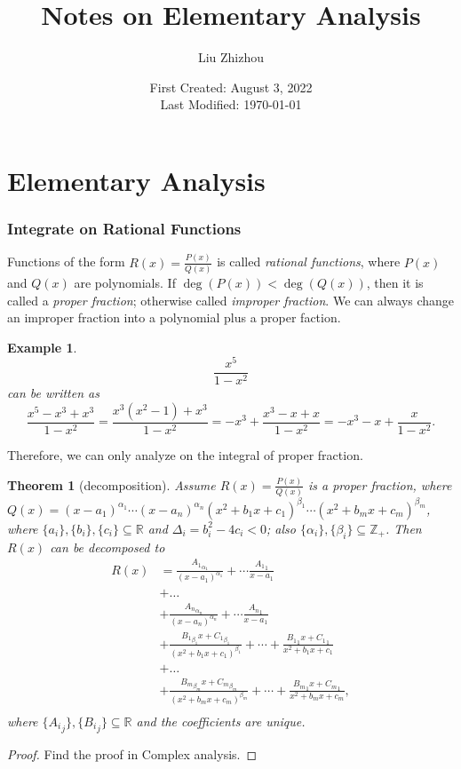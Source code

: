 \documentclass[12pt,a4paper]{article}
\title{Notes on Elementary Analysis}
\author{Liu Zhizhou}
\date{First Created: August 3, 2022\\
	Last Modified: \today}
\numberwithin{equation}{section}
\theoremstyle{mystyle}
\newtheorem{theorem}[definition]{Theorem}
\newtheorem{example}[definition]{Example}
\newcommand{\R}{\mathbb{R}}
\newcommand{\Z}{\mathbb{Z}}
\begin{document}
	{\sffamily\bfseries \maketitle}
	
	
	\tableofcontents
	\part{Elementary Analysis}
	\section{Integrate on Rational Functions}
	Functions of the form $R(x)=\frac{P(x)}{Q(x)}$ is called \emph{rational functions}, where $P(x)$ and $Q(x)$ are polynomials. If $\deg(P(x))<\deg(Q(x))$, then it is called a \emph{proper fraction}; otherwise called \emph{improper fraction}. We can always change an improper fraction into a polynomial plus a proper faction.
	\begin{example}
		$$\frac{x^5}{1-x^2}$$ can be written as $$\frac{x^5-x^3+x^3}{1-x^2}=\frac{x^3(x^2-1)+x^3}{1-x^2}=-x^3+\frac{x^3-x+x}{1-x^2}=-x^3-x+\frac{x}{1-x^2}.$$
	\end{example}
	Therefore, we can only analyze on the integral of proper fraction.
	\begin{theorem}[decomposition]
		Assume $R(x)=\frac{P(x)}{Q(x)}$ is a proper fraction, where $Q(x)=(x-a_1)^{\alpha_1}\cdots (x-a_n)^{\alpha_n}(x^2+b_1 x+c_1)^{\beta_1}\cdots (x^2+b_m x+c_m)^{\beta_m}$, where $\{a_i\},\{b_i\},\{c_i\}\subseteq \R$ and $\Delta_i = b_i^2-4c_i<0$; also $\{\alpha_i\},\{\beta_i\}\subseteq \Z_+$. Then $R(x)$ can be decomposed to
		\begin{align*}
			R(x)  &=\frac{{A_1}_{\alpha_1}}{(x-a_1)^{\alpha_1}}+\cdots \frac{{A_1}_{1}}{x-a_1}\\
			&+\dots\\
			&+\frac{{A_n}_{\alpha_n}}{(x-a_n)^{\alpha_n}}+\cdots \frac{{A_n}_{1}}{x-a_1}\\
			&+\frac{{B_1}_{\beta_1}x+{C_1}_{\beta_1}}{(x^2+b_1 x+c_1)^{\beta_1}} + \cdots + \frac{{B_1}_{1}x+{C_1}_{1}}{x^2+b_1 x+c_1}\\
			&+\dots\\
			&+\frac{{B_m}_{\beta_m}x+{C_m}_{\beta_m}}{(x^2+b_m x+c_m)^{\beta_m}}+ \cdots + \frac{{B_m}_{1}x+{C_m}_{1}}{x^2+b_m x+c_m},\\
		\end{align*}
		where $\{{A_i}_j\}, \{{B_i}_j\} \subseteq \R$ and the coefficients are unique. 
	\end{theorem}
	\begin{proof}
		Find the proof in Complex analysis.
	\end{proof}
	
\end{document}
